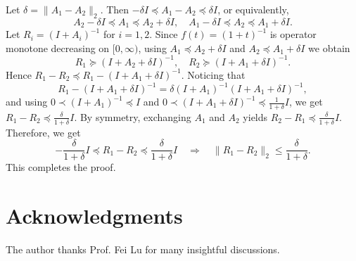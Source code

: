 \documentclass[]{myarticle}
\begin{document}
\begin{proofof}{}
  Let $\delta=\|A_1-A_2\|_2$. Then $-\delta I \preceq A_1-A_2 \preceq \delta I$, or equivalently,   
  \[A_2-\delta I \preceq A_1 \preceq A_2+\delta I, \quad
  A_1-\delta I \preceq A_2 \preceq A_1+\delta I.\]
  Let $R_i=(I+A_i)^{-1}$ for $i=1,2$. Since $f(t)=(1+t)^{-1}$ is operator monotone decreasing on $[0,\infty)$, using $A_1 \preceq A_2+\delta I$ and $A_2 \preceq A_1+\delta I$ we obtain
  \[R_1 \succeq (I+A_2+\delta I)^{-1}, \quad
  R_2 \succeq (I+A_1+\delta I)^{-1}.\]
  Hence $R_1-R_2 \preceq R_1-(I+A_1+\delta I)^{-1}.$ Noticing that
  \[R_1-(I+A_1+\delta I)^{-1} = \delta (I+A_1)^{-1}(I+A_1+\delta I)^{-1},\]
  and using $0\prec (I+A_1)^{-1}\preceq I$ and $0\prec (I+A_1+\delta I)^{-1}\preceq \frac{1}{1+\delta}I$, we get $R_1-R_2 \preceq \frac{\delta}{1+\delta}I$. By symmetry, exchanging $A_1$ and $A_2$ yields $R_2-R_1 \preceq \frac{\delta}{1+\delta}I$. Therefore, we get 
  \begin{equation*}
    -\frac{\delta}{1+\delta}I \preceq R_1-R_2 \preceq \frac{\delta}{1+\delta}I \quad
    \Rightarrow \quad \|R_1-R_2\|_2\le \frac{\delta}{1+\delta} .
  \end{equation*}
  This completes the proof.
\end{proofof}


\section*{Acknowledgments}
The author thanks Prof. Fei Lu for many insightful discussions.


 

\end{document}
